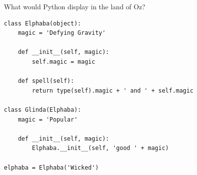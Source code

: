 \question What would Python display in the land of Oz?

\begin{lstlisting}
class Elphaba(object):
    magic = 'Defying Gravity'

    def __init__(self, magic):
        self.magic = magic

    def spell(self):
        return type(self).magic + ' and ' + self.magic

class Glinda(Elphaba):
    magic = 'Popular'

    def __init__(self, magic):
        Elphaba.__init__(self, 'good ' + magic)

elphaba = Elphaba('Wicked')
\end{lstlisting}   

